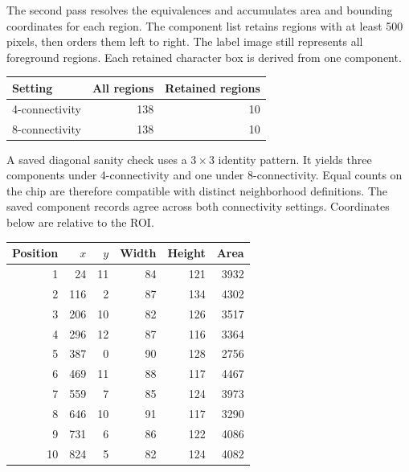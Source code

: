 The second pass resolves the equivalences and accumulates area and bounding coordinates for each region. The component list retains regions with at least 500 pixels, then orders them left to right. The label image still represents all foreground regions. Each retained character box is derived from one component.
\begin{center}\end{center}
\begin{center}\begin{tabular}{lrr}\toprule Setting & All regions & Retained regions\\\midrule
4-connectivity & 138 & 10\\8-connectivity & 138 & 10\\\bottomrule\end{tabular}\end{center}
A saved diagonal sanity check uses a $3\times3$ identity pattern. It yields three components under 4-connectivity and one under 8-connectivity. Equal counts on the chip are therefore compatible with distinct neighborhood definitions.
The saved component records agree across both connectivity settings. Coordinates below are relative to the ROI.
\begin{center}\begin{tabular}{rrrrrr}\toprule Position & $x$ & $y$ & Width & Height & Area\\\midrule
1 & 24 & 11 & 84 & 121 & 3932 \\
2 & 116 & 2 & 87 & 134 & 4302 \\
3 & 206 & 10 & 82 & 126 & 3517 \\
4 & 296 & 12 & 87 & 116 & 3364 \\
5 & 387 & 0 & 90 & 128 & 2756 \\
6 & 469 & 11 & 88 & 117 & 4467 \\
7 & 559 & 7 & 85 & 124 & 3973 \\
8 & 646 & 10 & 91 & 117 & 3290 \\
9 & 731 & 6 & 86 & 122 & 4086 \\
10 & 824 & 5 & 82 & 124 & 4082 \\
\bottomrule\end{tabular}\end{center}

